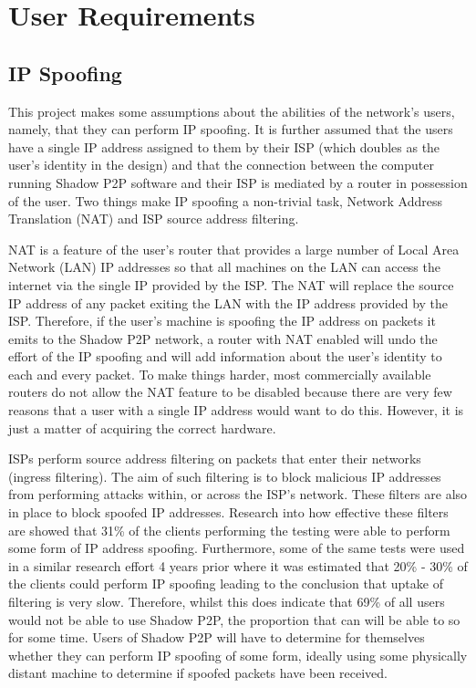 \documentclass[ %
                    author={Luke Murray},
                supervisor={Dr. Simon Hollis},
                     title={Shadow Peer-to-Peer Networks},
                  subtitle={},
                    degree={MEng},
                      year={2013} ]{thesis}
\begin{document}
\section{User Requirements}
\subsection{IP Spoofing}

This project makes some assumptions about the abilities of the network's users, namely, that they can perform IP spoofing. It is further assumed that the users have a single IP address assigned to them by their ISP (which doubles as the user's identity in the design) and that the connection between the computer running Shadow P2P software and their ISP is mediated by a router in possession of the user. Two things make IP spoofing a non-trivial task, Network Address Translation (NAT) and ISP source address filtering.

NAT is a feature of the user's router that provides a large number of Local Area Network (LAN) IP addresses so that all machines on the LAN can access the internet via the single IP provided by the ISP. The NAT will replace the source IP address of any packet exiting the LAN with the IP address provided by the ISP. Therefore, if the user's machine is spoofing the IP address on packets it emits to the Shadow P2P network, a router with NAT enabled will undo the effort of the IP spoofing and will add information about the user's identity to each and every packet. To make things harder, most commercially available routers do not allow the NAT feature to be disabled because there are very few reasons that a user with a single IP address would want to do this. However, it is just a matter of acquiring the correct hardware.

ISPs perform source address filtering on packets that enter their networks (ingress filtering). The aim of such filtering is to block malicious IP addresses from performing attacks within, or across the ISP's network. These filters are also in place to block spoofed IP addresses. Research into how effective these filters are showed that 31\% of the clients performing the testing were able to perform some form of IP address spoofing\cite{beverly2009understanding}. Furthermore, some of the same tests were used in a similar research effort 4 years prior\cite{bb-spoofer-sruti} where it was estimated that 20\% - 30\% of the clients could perform IP spoofing leading to the conclusion that uptake of filtering is very slow. Therefore, whilst this does indicate that 69\% of all users would not be able to use Shadow P2P, the proportion that can will be able to so for some time. Users of Shadow P2P will have to determine for themselves whether they can perform IP spoofing of some form, ideally using some physically distant machine to determine if spoofed packets have been received.
\end{document}
